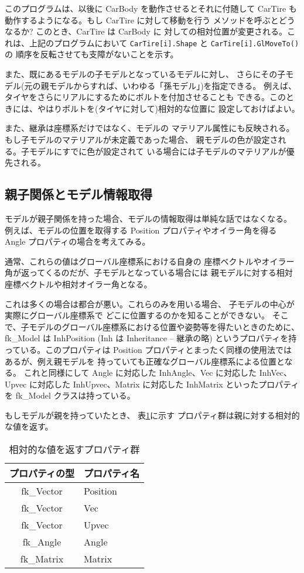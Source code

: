 このプログラムは、以後に CarBody を動作させるとそれに付随して
CarTire も動作するようになる。もし CarTire に対して移動を行う
メソッドを呼ぶとどうなるか? このとき、CarTire は CarBody に
対しての相対位置が変更される。これは、上記のプログラムにおいて
{\tt CarTire[i].Shape} と {\tt CarTire[i].GlMoveTo()} の
順序を反転させても支障がないことを示す。

また、既にあるモデルの子モデルとなっているモデルに対し、
さらにその子モデル(元の親モデルからすれば、いわゆる「孫モデル」)を指定できる。
例えば、タイヤをさらにリアルにするためにボルトを付加させることも
できる。このときには、やはりボルトを(タイヤに対して)相対的な位置に
設定しておけばよい。

また、継承は座標系だけではなく、モデルの
マテリアル属性にも反映される。もし子モデルのマテリアルが未定義であった場合、
親モデルの色が設定される。子モデルにすでに色が設定されて
いる場合には子モデルのマテリアルが優先される。

\subsection{親子関係とモデル情報取得}
モデルが親子関係を持った場合、モデルの情報取得は単純な話ではなくなる。
例えば、モデルの位置を取得する Position プロパティやオイラー角を得る
Angle プロパティの場合を考えてみる。

通常、これらの値はグローバル座標系における自身の
座標ベクトルやオイラー角が返ってくるのだが、子モデルとなっている場合には
親モデルに対する相対座標ベクトルや相対オイラー角となる。

これは多くの場合は都合が悪い。これらのみを用いる場合、
子モデルの中心が実際にグローバル座標系で
どこに位置するのかを知ることができない。
そこで、子モデルのグローバル座標系における位置や姿勢等を得たいときのために、
fk\_Model は InhPosition (Inh は Inheritance -- 継承の略)
というプロパティを持っている。このプロパティは
Position プロパティとまったく同様の使用法ではあるが、例え親モデルを
持っていても正確なグローバル座標系による位置となる。
これと同様にして Angle に対応した
InhAngle、Vec に対応した InhVec、Upvec に対応した
InhUpvec、Matrix に対応した InhMatrix といったプロパティを
fk\_Model クラスは持っている。

もしモデルが親を持っていたとき、
表\ref{tbl:fkInh1}に示す
プロパティ群は親に対する相対的な値を返す。

\begin{table}[H]
\caption{相対的な値を返すプロパティ群}
\label{tbl:fkInh1}
\begin{center}
\begin{tabular}{|c|l|}
\hline
プロパティの型 & プロパティ名 \\ \hline \hline
fk\_Vector & Position \\ \hline
fk\_Vector & Vec \\ \hline
fk\_Vector & Upvec \\ \hline
fk\_Angle & Angle \\ \hline
fk\_Matrix & Matrix \\ \hline
\end{tabular}
\end{center}
\end{table}

